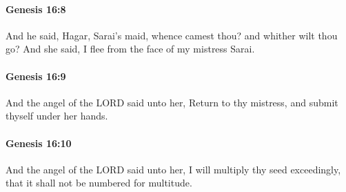 		\paragraph{Genesis 16:8} %
			\label{GENESIS-16-8}

			And he said, Hagar, Sarai's maid, whence camest thou?  and whither wilt thou go?  And she said, I flee from the face of my mistress Sarai.


		\paragraph{Genesis 16:9} %
			\label{GENESIS-16-9}

			And the angel of the LORD said unto her, Return to thy mistress, and submit thyself under her hands.


		\paragraph{Genesis 16:10} %
			\label{GENESIS-16-10}

			And the angel of the LORD said unto her, I will multiply thy seed exceedingly, that it shall not be numbered for multitude.


